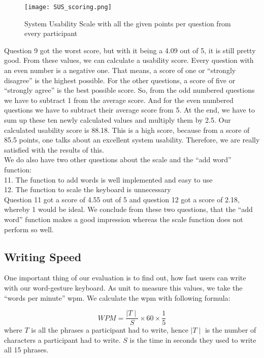 \begin{figure}
    \centering
    \texttt{[image: SUS\_scoring.png]}
    \caption{System Usability Scale with all the given points per question from every participant}
    \label{fig:SUS_score}
\end{figure}

Question 9 got the worst score, but with it being a 4.09 out of 5, it is still pretty good. From these values, we can calculate a usability score. Every question with an even number is a negative one. That means, a score of one or ``strongly disagree'' is the highest possible. For the other questions, a score of five or ``strongly agree'' is the best possible score. So, from the odd numbered questions we have to subtract 1 from the average score. And for the even numbered questions we have to subtract their average score from 5. At the end, we have to sum up these ten newly calculated values and multiply them by 2.5. Our calculated usability score is 88.18. This is a high score, because from a score of 85.5 points, one talks about an excellent system usability. Therefore, we are really satisfied with the results of this.\\
We do also have two other questions about the scale and the ``add word'' function:\\
11. The function to add words is well implemented and easy to use\\
12. The function to scale the keyboard is unnecessary\\
Question 11 got a score of 4.55 out of 5 and question 12 got a score of 2.18, whereby 1 would be ideal. We conclude from these two questions, that the ``add word'' function makes a good impression whereas the scale function does not perform so well.\\

\subsection{Writing Speed}
One important thing of our evaluation is to find out, how fast users can write with our word-gesture keyboard. As unit to measure this values, we take the ``words per minute'' wpm. We calculate the wpm with following formula: 

\begin{equation}
    WPM = \frac{\mid T \mid}{S} \times 60 \times \frac{1}{5}
\end{equation}
where $T$ is all the phrases a participant had to write, hence $\mid T \mid$ is the number of characters a participant had to write. $S$ is the time in seconds they used to write all 15 phrases.\\

